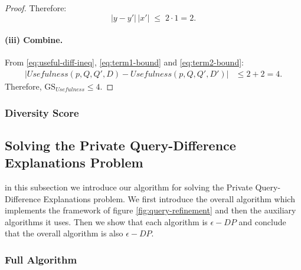 \begin{proof}
Therefore:
\begin{equation}
|y - y'|\,|x'|\;\leq\; 2\cdot 1=2.
\label{eq:term2-bound}
\end{equation}

\paragraph{(iii) Combine.}
From \eqref{eq:useful-diff-ineq}, \eqref{eq:term1-bound} and \eqref{eq:term2-bound}:
\begin{align}
|Usefulness(p,Q,Q',D) - Usefulness(p,Q,Q',D')| &\leq 2 +2 = 4.
\end{align}
Therefore, \(\mathrm{GS}_{Usefulness} \leq 4\).
\end{proof}

\subsubsection{Diversity Score}

\subsection{Solving the Private Query-Difference Explanations Problem}
in this subsection we introduce our algorithm for solving the Private Query-Difference Explanations problem.
We first introduce the overall algorithm which implements the framework of figure \ref{fig:query-refinement} and then the auxiliary algorithms it uses. Then we show that each algorithm is $\epsilon-DP$ and conclude that the overall algorithm is also $\epsilon-DP$.

\subsubsection{Full Algorithm}


